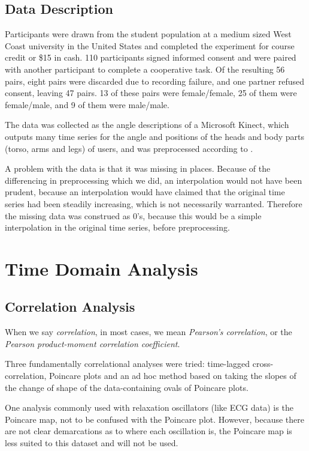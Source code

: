 \documentclass[12pt]{article}
\begin{document}
\subsection{Data Description}

Participants were drawn from the student population at a medium sized West Coast university in the United States and completed the experiment for course credit or \$15 in cash. 110 participants signed informed consent and were paired with another participant to complete a cooperative task.  Of the resulting 56 pairs, eight pairs were discarded due to recording failure, and one partner refused consent, leaving 47 pairs. 13 of these pairs were female/female, 25 of them were female/male, and 9 of them were male/male.

The data was collected as the angle descriptions of a Microsoft Kinect, which outputs many time series for the angle and positions of the heads and body parts (torso, arms and legs) of users, and was preprocessed according to \cite{andrea}.

A problem with the data is that it was missing in places. Because of the differencing in preprocessing which we did, an interpolation would not have been prudent, because an interpolation would have claimed that the original time series had been steadily increasing, which is not necessarily warranted. Therefore the missing data was construed as 0's, because this would be a simple interpolation in the original time series, before preprocessing.

\section{Time Domain Analysis}

\subsection{Correlation Analysis}

When we say \emph{correlation}, in most cases, we mean \emph{Pearson's correlation}, or the \emph{Pearson product-moment correlation coefficient}.

Three fundamentally correlational analyses were tried: time-lagged cross-correlation, Poincare plots and an ad hoc method based on taking the slopes of the change of shape of the data-containing ovals of Poincare plots.

One analysis commonly used with relaxation oscillators (like ECG data) is the Poincare map, not to be confused with the Poincare plot. However, because there are not clear demarcations as to where each oscillation is, the Poincare map is less suited to this dataset and will not be used\cite{physsync}.
\end{document}
